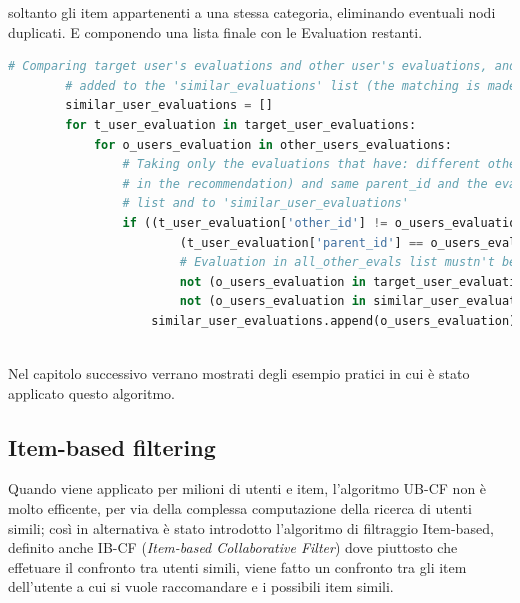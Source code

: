 \begin{description}
	soltanto gli item appartenenti a una stessa categoria, eliminando eventuali nodi duplicati. E componendo una lista finale con le Evaluation
	restanti.
	\begin{lstlisting}[language=Python, label=lst:UB_CF_4]
		# Comparing target user's evaluations and other user's evaluations, and if there is a match the evaluation is
		# added to the 'similar_evaluations' list (the matching is made comparing the 'parent_id')
		similar_user_evaluations = []
		for t_user_evaluation in target_user_evaluations:
			for o_users_evaluation in other_users_evaluations:
				# Taking only the evaluations that have: different other_id (excluding the target evaluation
				# in the recommendation) and same parent_id and the evaluations that weren't added to 'target_user_evaluations'
				# list and to 'similar_user_evaluations'
				if ((t_user_evaluation['other_id'] != o_users_evaluation['other_id']) and  # Evaluations must have different 'other_id'
						(t_user_evaluation['parent_id'] == o_users_evaluation['parent_id']) and  # Evaluations must have the same 'parent_id'
						# Evaluation in all_other_evals list mustn't be already added to \
						not (o_users_evaluation in target_user_evaluations) and  # the 'target_user_evaluations' list or
						not (o_users_evaluation in similar_user_evaluations)):  # the 'similar_user_evaluations' list
					similar_user_evaluations.append(o_users_evaluation)
	\end{lstlisting}
	
\end{description}

\ \\
Nel capitolo successivo verrano mostrati degli esempio pratici in cui è stato applicato questo algoritmo.

\newpage

\subsection{Item-based filtering} 
Quando viene applicato per milioni di utenti e item, l'algoritmo UB-CF non è molto efficente, per via della complessa computazione della 
ricerca di utenti simili; così in alternativa è stato introdotto l'algoritmo di filtraggio Item-based, definito anche IB-CF 
(\textit{Item-based Collaborative Filter}) dove piuttosto che effetuare il confronto tra utenti simili, viene fatto un confronto tra 
gli item dell'utente a cui si vuole raccomandare e i possibili item simili.

